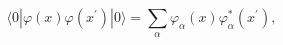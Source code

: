 \begin{equation}
\langle 0|\varphi (x)\varphi (x^{\prime })|0\rangle =\sum_{\alpha
}\varphi _{\alpha }(x)\varphi _{\alpha }^{\ast }(x^{\prime }),
\label{mfieldmodesum}
\end{equation}

